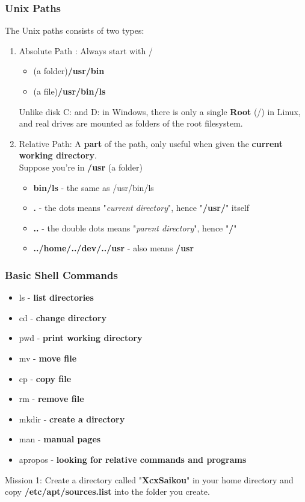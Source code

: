 \documentclass[11pt]{beamer}
\begin{document}
\begin{frame}
\frametitle{Unix Paths}
The Unix paths consists of two types:
\begin{enumerate}
\item Absolute Path :  Always start with /
\begin{itemize}
\item (a folder)\textbf{/usr/bin} 
\item  (a file)\textbf{/usr/bin/ls}
\end{itemize}
Unlike disk C: and D: in Windows, there is only a single \textbf{Root} (/) in Linux, and real drives are mounted as folders of the root filesystem.

\item Relative Path: A \textbf{part} of the path, only useful when given the \textbf{current working directory}.\\
Suppose you're in \textbf{/usr} (a folder)
\begin{itemize}
\item \textbf{bin/ls} - the same as /usr/bin/ls
\item \textbf{.} - the dots means "\textit{current directory}", hence "\textbf{/usr/}" itself
\item \textbf{..} - the double dots means "\textit{parent directory}", hence "\textbf{/}"
\item \textbf{../home/../dev/../usr} - also means \textbf{/usr} 
\end{itemize}
\end{enumerate}
\end{frame}

\begin{frame}
\frametitle{Basic Shell Commands}
\begin{itemize}
\item ls - \textbf{list directories}
\item cd - \textbf{change directory}
\item pwd - \textbf{print working directory}
\item mv - \textbf{move file}
\item cp - \textbf{copy file}
\item rm - \textbf{remove file}
\item mkdir - \textbf{create a directory}
\item man - \textbf{manual pages}
\item apropos - \textbf{looking for relative commands and programs}
\end{itemize}

Mission 1: Create a directory called "\textbf{XcxSaikou}" in your home directory  and copy \textbf{/etc/apt/sources.list} into the folder you create.
\end{frame}
\end{document}

